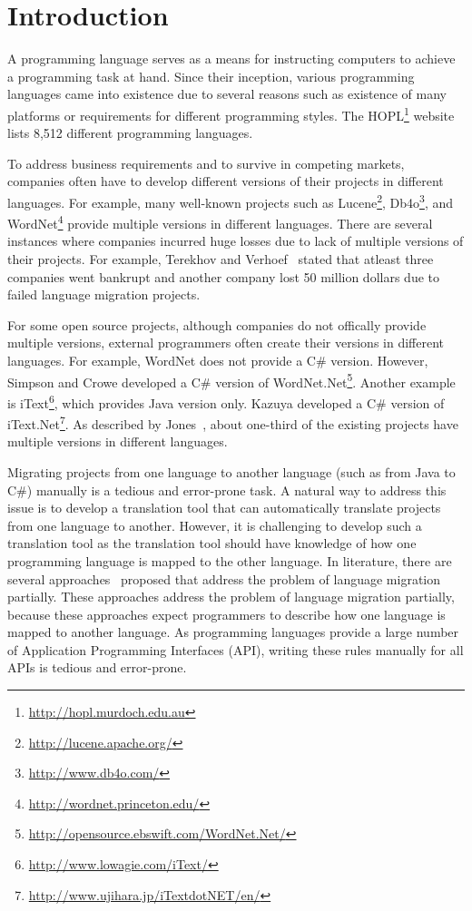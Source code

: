 \section{Introduction}
\label{sec:introduction} 

A programming language serves as a means for instructing computers to achieve a programming task at hand.
Since their inception, various programming languages came into existence due to several 
reasons such as existence of many platforms or requirements for different programming styles.
The HOPL\footnote{\url{http://hopl.murdoch.edu.au}} website lists 
8,512 different programming languages. 

To address business requirements and to survive in competing markets, companies
often have to develop different versions of their projects in different languages.
For example, many well-known projects such as Lucene\footnote{\url{http://lucene.apache.org/}},
Db4o\footnote{\url{http://www.db4o.com/}}, and WordNet\footnote{\url{http://wordnet.princeton.edu/}} provide
multiple versions in different languages. There are several instances where
companies incurred huge losses due to lack of multiple versions of their projects.
For example, Terekhov and Verhoef~\cite{terekhov2000realities} stated that atleast three
companies went bankrupt and another company lost 50 million dollars due to failed language migration projects.

For some open source projects, although companies do not offically provide multiple versions, external programmers often
create their versions in different languages. For example, WordNet does not
provide a C\# version. However, Simpson and Crowe developed
a C\# version of WordNet.Net\footnote{\url{http://opensource.ebswift.com/WordNet.Net/}}. 
Another example is iText\footnote{\url{http://www.lowagie.com/iText/}}, which
provides Java version only. Kazuya developed a C\# version of 
iText.Net\footnote{\url{http://www.ujihara.jp/iTextdotNET/en/}}. As described by Jones~\cite{jones1998estimating}, 
about one-third of the existing projects have multiple versions in different languages.

Migrating projects from one language to another language (such as from Java to C\#) manually
is a tedious and error-prone task. A natural way to address this issue is to develop
a translation tool that can automatically translate projects from one language to another.
However, it is challenging to develop such a translation tool as the translation tool should
have knowledge of how one programming language is mapped to the other language. In literature,
there are several approaches~\cite{mossienko2003automated, yasumatsu1995spice, hainaut2008migration}
proposed that address the problem of language migration partially. These approaches address 
the problem of language migration partially, because these approaches expect programmers
to describe how one language is mapped to another language. As programming languages provide
a large number of Application Programming Interfaces (API), writing these rules manually 
for all APIs is tedious and error-prone.

